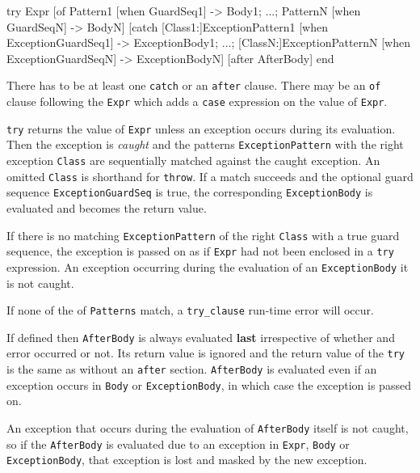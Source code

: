 \begin{erlang}
try Expr [of
    Pattern1 [when GuardSeq1] -> Body1;
    ...;
    PatternN [when GuardSeqN] -> BodyN]
[catch
    [Class1:]ExceptionPattern1 [when ExceptionGuardSeq1] -> ExceptionBody1;
    ...;
    [ClassN:]ExceptionPatternN [when ExceptionGuardSeqN] -> ExceptionBodyN]
[after AfterBody]
end
\end{erlang}

There has to be at least one \texttt{catch} or an \texttt{after}
clause. There may be an \texttt{of} clause following the \texttt{Expr}
which adds a \texttt{case} expression on the value of \texttt{Expr}.

\texttt{try} returns the value of \texttt{Expr} unless an exception
occurs during its evaluation. Then the exception is \textit{caught}
and the patterns \texttt{ExceptionPattern} with the right exception
\texttt{Class} are sequentially matched against the caught exception. An
omitted \texttt{Class} is shorthand for \texttt{throw}. If a match succeeds and the
optional guard sequence \texttt{ExceptionGuardSeq} is true, the
corresponding \texttt{ExceptionBody} is evaluated and becomes the return
value.

If there is no matching \texttt{ExceptionPattern} of the right \texttt{Class}
with a true guard sequence, the exception is passed on as if
\texttt{Expr} had not been enclosed in a \texttt{try} expression. An exception
occurring during the evaluation of an \texttt{ExceptionBody} it is not
caught.

If none of the of \texttt{Patterns} match, a \texttt{try\_clause} run-time
error will occur.

If defined then \texttt{AfterBody} is always evaluated \textbf{last}
irrespective of whether and error occurred or not. Its return value is
ignored and the return value of the \texttt{try} is the same as
without an \texttt{after} section. \texttt{AfterBody} is evaluated
even if an exception occurs in \texttt{Body} or
\texttt{ExceptionBody}, in which case the exception is passed on.


An exception that occurs during the evaluation of \texttt{AfterBody}
itself is not caught, so if the \texttt{AfterBody} is evaluated due to
an exception in \texttt{Expr}, \texttt{Body} or
\texttt{ExceptionBody}, that exception is lost and masked by the new
exception.

